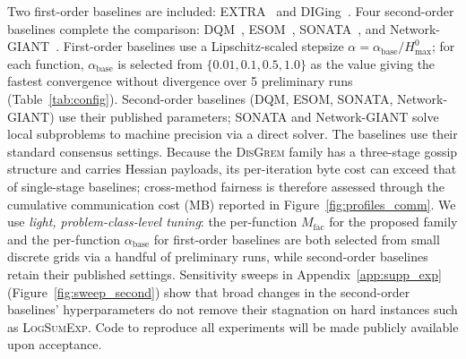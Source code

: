 \documentclass[review,onefignum,onetabnum]{siamart171218}
\begin{document}
	Two first-order baselines are included:
	EXTRA~\citep{shi2015extra} and
	DIGing~\citep{nedic2017diging}.
	Four second-order baselines complete the comparison:
	DQM~\citep{eisen2017dqn},
	ESOM~\citep{mokhtari2016esom},
	SONATA~\citep{sun2022sonata}, and
	Network-GIANT~\citep{maritan2023networkgiant}.
	First-order baselines use a Lipschitz-scaled stepsize
	$\alpha=\alpha_{\mathrm{base}}/H_{\max}^{0}$;
	for each function, $\alpha_{\mathrm{base}}$ is selected from
	$\{0.01, 0.1, 0.5, 1.0\}$ as the value giving the fastest
	convergence without divergence over 5 preliminary runs
	(Table~\ref{tab:config}).
	Second-order baselines (DQM, ESOM, SONATA, Network-GIANT) use their
	published parameters; SONATA and Network-GIANT solve local
	subproblems to machine precision via a direct solver.
	The baselines use their standard consensus settings.
	Because the \textsc{DisGrem} family has a three-stage gossip
	structure and carries Hessian payloads, its per-iteration byte cost
	can exceed that of single-stage baselines; cross-method fairness is
	therefore assessed through the cumulative communication cost (MB)
	reported in Figure~\ref{fig:profiles_comm}.
	We use \emph{light, problem-class-level tuning}:
	the per-function $M_{\mathrm{fac}}$ for the proposed family and the
	per-function $\alpha_{\mathrm{base}}$ for first-order baselines are
	both selected from small discrete grids via a handful of preliminary
	runs, while second-order baselines retain their published settings.
	Sensitivity sweeps in Appendix~\ref{app:supp_exp}
	(Figure~\ref{fig:sweep_second}) show that broad changes in the
	second-order baselines' hyperparameters do not remove their stagnation
	on hard instances such as \textsc{LogSumExp}.
	Code to reproduce all experiments will be made publicly available
	upon acceptance.
	
\end{document}

